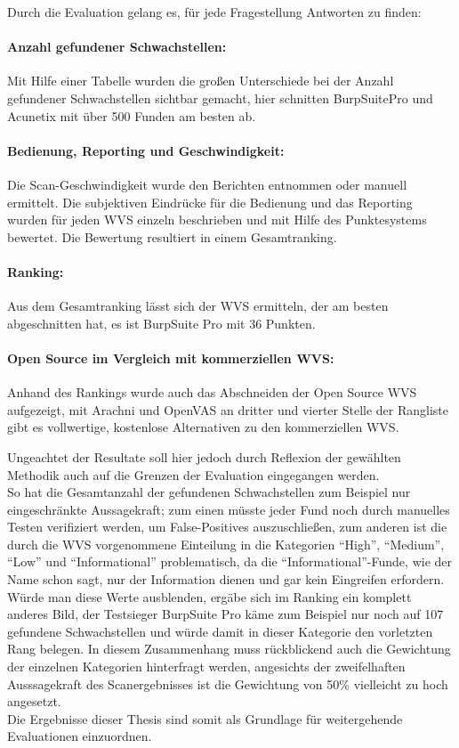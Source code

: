 \documentclass[12pt,oneside,a4paper,parskip,pointlessnumbers]{scrbook}
\begin{document}
Durch die Evaluation gelang es, für jede Fragestellung Antworten zu finden:
\paragraph{Anzahl gefundener Schwachstellen:}
Mit Hilfe einer Tabelle wurden die großen Unterschiede bei der Anzahl gefundener Schwachstellen sichtbar gemacht, hier schnitten BurpSuitePro und Acunetix mit über 500 Funden am besten ab.
\paragraph{Bedienung, Reporting und Geschwindigkeit:}
Die Scan-Geschwindigkeit wurde den Berichten entnommen oder manuell ermittelt. Die subjektiven Eindrücke für die Bedienung und das Reporting wurden für jeden WVS einzeln beschrieben und mit Hilfe des Punktesystems bewertet. Die Bewertung resultiert in einem Gesamtranking.
\paragraph{Ranking:} Aus dem Gesamtranking lässt sich der WVS ermitteln, der am besten abgeschnitten hat, es ist BurpSuite Pro mit 36 Punkten.
\paragraph{Open Source im Vergleich mit kommerziellen WVS:}
Anhand des Rankings wurde auch das Abschneiden der Open Source WVS aufgezeigt, mit Arachni und OpenVAS an dritter und vierter Stelle der Rangliste gibt es vollwertige, kostenlose Alternativen zu den kommerziellen WVS.

Ungeachtet der Resultate soll hier jedoch durch Reflexion der gewählten Methodik auch auf die Grenzen der Evaluation eingegangen werden.\\
So hat die Gesamtanzahl der gefundenen Schwachstellen zum Beispiel nur eingeschränkte Aussagekraft; zum einen müsste jeder Fund noch durch manuelles Testen verifiziert werden, um False-Positives auszuschließen, zum anderen ist die durch die WVS vorgenommene Einteilung in die Kategorien ``High'', ``Medium'', ``Low'' und ``Informational'' problematisch, da die ``Informational''-Funde, wie der Name schon sagt, nur der Information dienen und gar kein Eingreifen erfordern. Würde man diese Werte ausblenden, ergäbe sich im Ranking ein komplett anderes Bild, der Testsieger BurpSuite Pro käme zum Beispiel nur noch auf 107 gefundene Schwachstellen und würde damit in dieser Kategorie den vorletzten Rang belegen. In diesem Zusammenhang muss rückblickend auch die Gewichtung der einzelnen Kategorien hinterfragt werden, angesichts der zweifelhaften Ausssagekraft des Scanergebnisses ist die Gewichtung von 50\% vielleicht zu hoch angesetzt. \\
Die Ergebnisse dieser Thesis sind somit als Grundlage für weitergehende Evaluationen einzuordnen.
\end{document}
